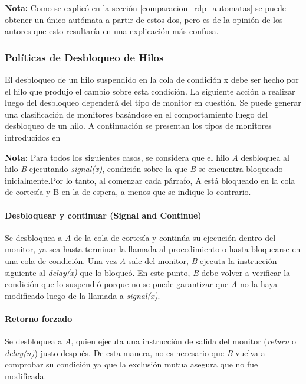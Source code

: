 \begin{framed}
\textbf{Nota:} Como se explicó en la sección \ref{comparacion_rdp_automatas} se
puede obtener un único autómata a partir de estos dos, pero es de la opinión de los autores
que esto resultaría en una explicación más confusa.
\end{framed}

\subsubsection{Políticas de Desbloqueo de Hilos}
\label{politica_monitor}
El desbloqueo de un hilo suspendido en la cola de condición x debe ser hecho
por el hilo que produjo el cambio sobre esta condición. La siguiente acción a
realizar luego del desbloqueo dependerá del tipo de monitor en cuestión.
Se puede generar una clasificación de monitores basándose en el comportamiento
luego del desbloqueo de un hilo. A continuación se presentan los tipos de
monitores introducidos en \cite{PalmaConcurrente}

\begin{framed}
\textbf{Nota:} Para todos los siguientes casos, se considera que el hilo
\textit{A} desbloquea al hilo \textit{B} ejecutando \textit{signal(x)},
condición sobre la que \textit{B} se encuentra bloqueado inicialmente.Por lo
tanto, al comenzar cada párrafo, A está bloqueado en la cola de cortesía y B en
la de espera, a menos que se indique lo contrario.
\end{framed}

\paragraph{Desbloquear y continuar (Signal and Continue)}
Se desbloquea a \textit{A} de la cola de cortesía y continúa su ejecución dentro
del monitor, ya sea hasta terminar la llamada al procedimiento o hasta bloquearse
en una cola de condición. Una vez \textit{A} sale del monitor, \textit{B}
ejecuta la instrucción siguiente al \textit{delay(x)} que lo bloqueó. En este
punto, \textit{B} debe volver a verificar la condición que lo suspendió porque
no se puede garantizar que \textit{A} no la haya modificado luego de la llamada
a \textit{signal(x)}.

\paragraph{Retorno forzado}
Se desbloquea a \textit{A}, quien ejecuta una instrucción de salida del monitor
(\textit{return} o \textit{delay(n)}) justo después. De esta manera, no es
necesario que \textit{B} vuelva a comprobar su condición ya que la exclusión
mutua asegura que no fue modificada.


